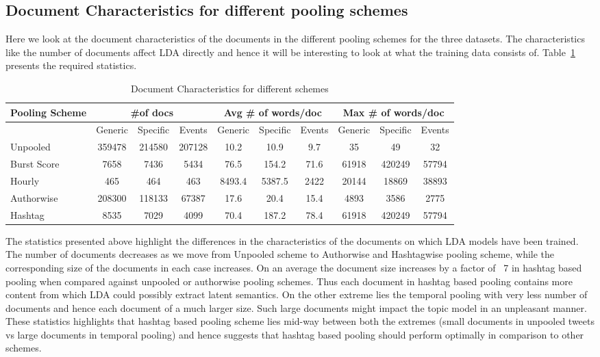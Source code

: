 \documentclass[10pt,a5paper,twoside]{article}
\begin{document}
\subsection{Document Characteristics for different pooling schemes}
Here we look at the document characteristics of the documents in the different pooling schemes for the three datasets. The characteristics like the number of documents affect LDA directly and hence it will be interesting to look at what the training data consists of. Table~\ref{tbl-3} presents the required statistics.

\begin{table}[!h]
\centering
\resizebox{14cm}{!} 
{
	\begin{tabular}{|l|ccc|ccc|ccc|}
	\hline
	Pooling Scheme  & \multicolumn {3}{c}{\#of docs} & \multicolumn {3}{c}{Avg \# of words/doc} & \multicolumn {3}{c|}{Max \# of words/doc}\\
	\hline
	 & Generic & Specific & Events &  Generic & Specific & Events &  Generic & Specific & Events\\
	\hline
	Unpooled & 359478 & 214580 & 207128 & 10.2 & 10.9 & 9.7 & 35 & 49 & 32 \\
	\hline
	Burst Score & 7658 & 7436 & 5434 & 76.5 & 154.2 & 71.6 & 61918 & 420249 & 57794 \\
	\hline
	Hourly & 465 & 464 & 463 & 8493.4 & 5387.5 & 2422 & 20144 & 18869 & 38893 \\
	\hline
	Authorwise & 208300 & 118133 & 67387 & 17.6 & 20.4 & 15.4 & 4893 & 3586 & 2775 \\
	\hline
	Hashtag & 8535 & 7029 & 4099 & 70.4 & 187.2 & 78.4 & 61918 & 420249 & 57794 \\
	\hline
	\end{tabular}
}
\caption{Document Characteristics for different schemes}\label{tbl-3}
\end{table}

The statistics presented above highlight the differences in the characteristics of the documents on which LDA models have been trained. The number of documents decreases as we move from Unpooled scheme to Authorwise and Hashtagwise pooling scheme, while the corresponding size of the documents in each case increases. On an average the document size increases by a factor of ~7 in hashtag based pooling when compared against unpooled or authorwise pooling schemes. Thus each document in hashtag based pooling contains more content from which LDA could possibly extract latent semantics. On the other extreme lies the temporal pooling with very less number of documents and hence each document of a much larger size. Such large documents might impact the topic model in an unpleasant manner. These statistics highlights that hashtag based pooling scheme lies mid-way between both the extremes (small documents in unpooled tweets vs large documents in temporal pooling) and hence suggests that hashtag based pooling should perform optimally in comparison to other schemes.
\end{document}
